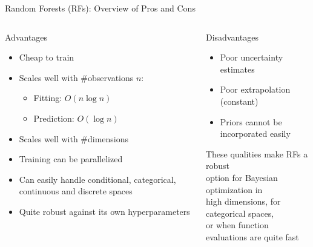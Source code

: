 \begin{frame}[c]{Random Forests (RFs): Overview of Pros and Cons}

\begin{columns}[T] %
\begin{column}{.48\textwidth}

    \begin{block}{Advantages}
    \begin{itemize}
        \item Cheap to train 
        \item Scales well with \#observations $n$: 
        \begin{itemize}
        	\item Fitting: $O(n \log n)$ 
        	\item Prediction: $O(\log n)$
        \end{itemize}
        \item Scales well with \#dimensions
        \item Training can be parallelized 
        \item Can easily handle conditional, categorical, continuous and discrete spaces 
        \item Quite robust against its own hyperparameters
    \end{itemize}
    \end{block}
\end{column}%

\hfill%
\pause

\begin{column}{.48\textwidth}
    \begin{block}{Disadvantages}
    \begin{itemize}
        \item Poor uncertainty estimates 
        \item Poor extrapolation (constant) 
    	\item Priors cannot be incorporated easily 
    \end{itemize}
    \end{block}

\pause
\bigskip
\bigskip
\hspace*{0.5cm}These qualities make RFs a \alert{robust} \\
\hspace*{0.5cm}\alert{option} for Bayesian optimization in \\ \hspace*{0.5cm}\alert{high dimensions}, for \alert{categorical spaces},\\
\hspace*{0.5cm}or when function evaluations are quite fast

\end{column}
\end{columns}

\end{frame}
